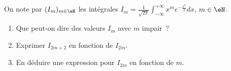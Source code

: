 \begin{exercice}\label{exoIntegralesMultiples0015}

 On note par $(I_m)_{m \in \eN}$ les intégrales $I_m = \frac{1}{\sqrt{2\pi}} \int_{-\infty}^{+\infty} x^m e^{-\frac{x^2}{2}}dx$, $m \in \eN$.
 \begin{enumerate}
	 \item
Que peut-on dire des valeurs $I_m$ avec $m$ impair~?
\item
Exprimer $I_{2m+2}$ en fonction de $I_{2m}$.
\item
En déduire une expression pour $I_{2m}$ en fonction de $m$.

		 
 \end{enumerate}

\end{exercice}
